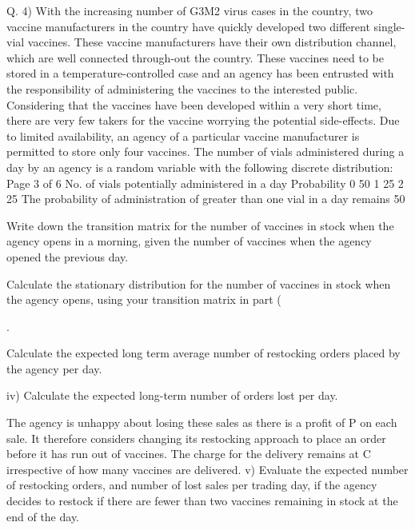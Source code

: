 \documentclass[a4paper,12pt]{article}
\begin{document}


Q. 4)
With the increasing number of G3M2 virus cases in the country, two vaccine manufacturers in the country have quickly developed two different single-vial vaccines. These vaccine manufacturers have their own distribution channel, which are well connected through-out the country. These vaccines need to be stored in a temperature-controlled case and an agency has been entrusted with the responsibility of administering the vaccines to the interested public. Considering that the vaccines have been developed within a very short time, there are very few takers for the vaccine worrying the potential side-effects. Due to limited availability, an agency of a particular vaccine manufacturer is permitted to store only four vaccines.
The number of vials administered during a day by an agency is a random variable with the following discrete distribution:
Page 3 of 6
No. of vials potentially administered in a day
Probability
0
50%
1
25%
2
25%
The probability of administration of greater than one vial in a day remains 50%
\item  Write down the transition matrix for the number of vaccines in stock when the agency opens in a morning, given the number of vaccines when the agency opened the previous day.

\item   Calculate the stationary distribution for the number of vaccines in stock when the agency opens, using your transition matrix in part (\item .

\item   Calculate the expected long term average number of restocking orders placed by the agency per day.

iv) Calculate the expected long-term number of orders lost per day.

The agency is unhappy about losing these sales as there is a profit of P on each sale. It therefore considers changing its restocking approach to place an order before it has run out of vaccines. The charge for the delivery remains at C irrespective of how many vaccines are delivered.
v) Evaluate the expected number of restocking orders, and number of lost sales per trading day, if the agency decides to restock if there are fewer than two vaccines remaining in stock at the end of the day.
\end{document}
